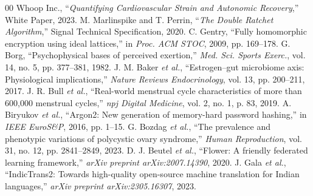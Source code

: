 \documentclass[conference]{IEEEtran}
\begin{document}
\begin{thebibliography}{00}
 Whoop Inc., ``\textit{Quantifying Cardiovascular Strain and Autonomic Recovery},'' White Paper, 2023.
 M. Marlinspike and T. Perrin, ``\textit{The Double Ratchet Algorithm},'' Signal Technical Specification, 2020.
 C. Gentry, ``Fully homomorphic encryption using ideal lattices,'' in \textit{Proc. ACM STOC}, 2009, pp. 169--178.
 G. Borg, ``Psychophysical bases of perceived exertion,'' \textit{Med. Sci. Sports Exerc.}, vol. 14, no. 5, pp. 377--381, 1982.
 J. M. Baker \textit{et al.}, ``Estrogen--gut microbiome axis: Physiological implications,'' \textit{Nature Reviews Endocrinology}, vol. 13, pp. 200--211, 2017.
 J. R. Bull \textit{et al.}, ``Real-world menstrual cycle characteristics of more than 600,000 menstrual cycles,'' \textit{npj Digital Medicine}, vol. 2, no. 1, p. 83, 2019.
 A. Biryukov \textit{et al.}, ``Argon2: New generation of memory-hard password hashing,'' in \textit{IEEE EuroS\&P}, 2016, pp. 1--15.
 G. Bozdag \textit{et al.}, ``The prevalence and phenotypic variations of polycystic ovary syndrome,'' \textit{Human Reproduction}, vol. 31, no. 12, pp. 2841--2849, 2023.
 D. J. Beutel \textit{et al.}, ``Flower: A friendly federated learning framework,'' \textit{arXiv preprint arXiv:2007.14390}, 2020.
 J. Gala \textit{et al.}, ``IndicTrans2: Towards high-quality open-source machine translation for Indian languages,'' \textit{arXiv preprint arXiv:2305.16307}, 2023.
\end{thebibliography}
\end{document}
